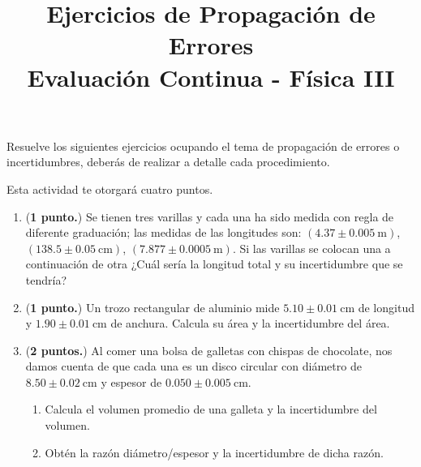 \documentclass[14pt]{extarticle}
\title{\vspace*{-2cm} Ejercicios de Propagación de Errores \\  Evaluación Continua - Física III\vspace{-5ex}}
\date{}
\begin{document}
\maketitle

Resuelve los siguientes ejercicios ocupando el tema de propagación de errores o incertidumbres, deberás de realizar a detalle cada procedimiento.

Esta actividad te otorgará cuatro puntos.

\begin{enumerate}
\item (\textbf{1 punto.}) Se tienen tres varillas y cada una ha sido medida con regla de diferente graduación; las medidas de las longitudes son: $(\num{4.37} \pm\SI{0.005}{\meter})$, $(\num{138.5} \pm \SI{0.05}{\centi\meter})$, $(\unit{7.877} \pm \SI{0.0005}{\meter})$. Si las varillas se colocan una a continuación de otra ¿Cuál sería la longitud total y su incertidumbre que se tendría?
\item (\textbf{1 punto.}) Un trozo rectangular de aluminio mide $\num{5.10} \pm \SI{0.01}{\centi\meter}$ de longitud y $\num{1.90} \pm \SI{0.01}{\centi\meter}$ de anchura. Calcula su área y la incertidumbre del área.
\item (\textbf{2 puntos.}) Al comer una bolsa de galletas con chispas de chocolate, nos damos cuenta de que cada una es un disco circular con diámetro de $\num{8.50} \pm \SI{0.02}{\centi\meter}$ y espesor de $\num{0.050} \pm \SI{0.005}{\centi\meter}$.
\begin{enumerate}
\item Calcula el volumen promedio de una galleta y la incertidumbre del volumen.
\item Obtén la razón diámetro/espesor y la incertidumbre de dicha razón.
\end{enumerate}
\end{enumerate}
\end{document}
